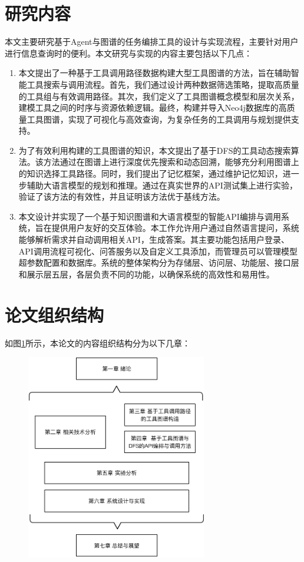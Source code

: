 \section{研究内容}
本文主要研究基于Agent与图谱的任务编排工具的设计与实现流程，主要针对用户进行信息查询时的便利。本文研究与实现的内容主要包括以下几点：

\begin{enumerate}
    \item 本文提出了一种基于工具调用路径数据构建大型工具图谱的方法，旨在辅助智能工具搜索与调用流程。首先，我们通过设计两种数据筛选策略，提取高质量的工具组与有效调用路径。其次，我们定义了工具图谱概念模型和层次关系，建模工具之间的时序与资源依赖逻辑。最终，构建并导入Neo4j数据库的高质量工具图谱，实现了可视化与高效查询，为复杂任务的工具调用与规划提供支持。
    \item 为了有效利用构建的工具图谱的知识，本文提出了基于DFS的工具动态搜索算法。该方法通过在图谱上进行深度优先搜索和动态回溯，能够充分利用图谱上的知识选择工具路径。同时，我们提出了记忆框架，通过维护记忆知识，进一步辅助大语言模型的规划和推理。通过在真实世界的API测试集上进行实验，验证了该方法的有效性，并且证明该方法优于基线方法。
    \item 本文设计并实现了一个基于知识图谱和大语言模型的智能API编排与调用系统，旨在提供用户友好的交互体验。本工作允许用户通过自然语言提问，系统能够解析需求并自动调用相关API，生成答案。其主要功能包括用户登录、API调用流程可视化、问答服务以及自定义工具添加，而管理员可以管理模型超参数配置和数据库。系统的整体架构分为存储层、访问层、功能层、接口层和展示层五层，各层负责不同的功能，以确保系统的高效性和易用性。
\end{enumerate}

\section{论文组织结构}

如图\ref{fig:ch1-structure}所示，本论文的内容组织结构分为以下几章：

\begin{figure}[!htp]
    \vspace{1em}
    \centering
    \setlength{\abovecaptionskip}{10pt} %
    \includegraphics[height=9cm]{../assets/ch1-论文结构.pdf}
    \label{fig:ch1-structure}
  \end{figure}

